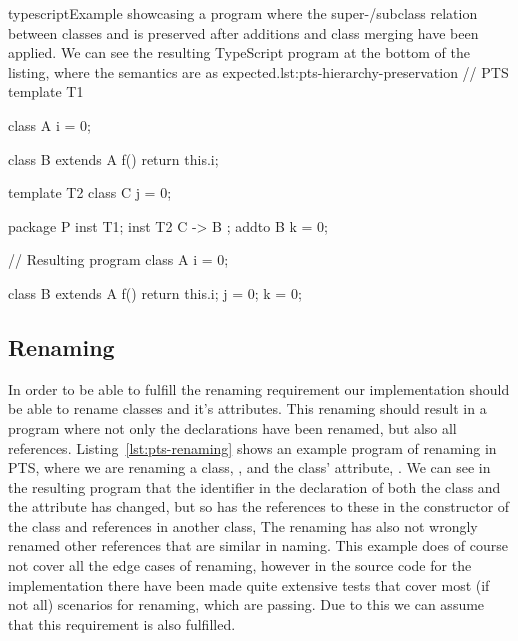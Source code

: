 \begin{code}{typescript}{Example showcasing a program where the super-/subclass relation between classes  and  is preserved after additions and class merging have been applied. We can see the resulting TypeScript program at the bottom of the listing, where the semantics are as expected.}{lst:pts-hierarchy-preservation}
    // PTS
    template T1 {
        class A {
            i = 0;
        }

        class B extends A {
            f() {
                return this.i;
            }
        }
    }

    template T2 {
        class C {
            j = 0;
        }
    }

    package P {
        inst T1;
        inst T2 { C -> B };
        addto B {
            k = 0;
        }
    }

    // Resulting program
    class A {
        i = 0;
    }

    class B extends A {
        f() {
            return this.i;
        }
        j = 0;
        k = 0;
    }
\end{code}

\subsection{Renaming}\label{subsec:pts-renaming}

In order to be able to fulfill the renaming requirement our implementation should be able to rename classes and it's attributes.
This renaming should result in a program where not only the declarations have been renamed, but also all references.
Listing~\vref{lst:pts-renaming} shows an example program of renaming in PTS, where we are renaming a class, , and the class' attribute, .
We can see in the resulting program that the identifier in the declaration of both the class and the attribute has changed, but so has the references to these in the constructor of the class and references in another class, 
The renaming has also not wrongly renamed other references that are similar in naming.
This example does of course not cover all the edge cases of renaming, however in the source code for the implementation there have been made quite extensive tests that cover most (if not all) scenarios for renaming, which are passing.
Due to this we can assume that this requirement is also fulfilled.


